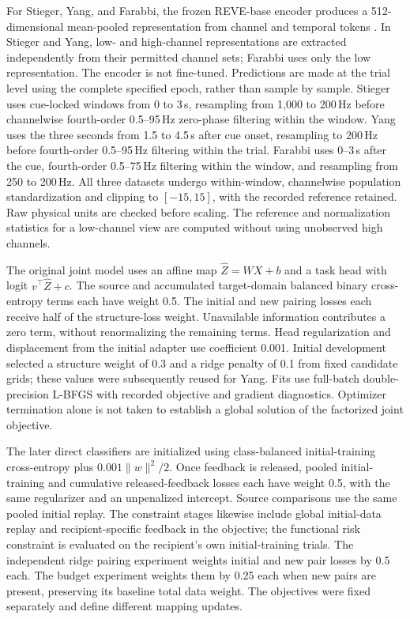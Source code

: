 \documentclass[11pt,a4paper]{article}
\begin{document}
For Stieger, Yang, and Farabbi, the frozen REVE-base encoder produces a 512-dimensional mean-pooled representation from channel and temporal tokens \cite{reve2025}. In Stieger and Yang, low- and high-channel representations are extracted independently from their permitted channel sets; Farabbi uses only the low representation. The encoder is not fine-tuned. Predictions are made at the trial level using the complete specified epoch, rather than sample by sample. Stieger uses cue-locked windows from 0 to 3\,s, resampling from 1,000 to 200\,Hz before channelwise fourth-order 0.5--95\,Hz zero-phase filtering within the window. Yang uses the three seconds from 1.5 to 4.5\,s after cue onset, resampling to 200\,Hz before fourth-order 0.5--95\,Hz filtering within the trial. Farabbi uses 0--3\,s after the cue, fourth-order 0.5--75\,Hz filtering within the window, and resampling from 250 to 200\,Hz. All three datasets undergo within-window, channelwise population standardization and clipping to $[-15,15]$, with the recorded reference retained. Raw physical units are checked before scaling. The reference and normalization statistics for a low-channel view are computed without using unobserved high channels.

The original joint model uses an affine map $\widehat Z=WX+b$ and a task head with logit $v^\top\widehat Z+c$. The source and accumulated target-domain balanced binary cross-entropy terms each have weight 0.5. The initial and new pairing losses each receive half of the structure-loss weight. Unavailable information contributes a zero term, without renormalizing the remaining terms. Head regularization and displacement from the initial adapter use coefficient 0.001. Initial development selected a structure weight of 0.3 and a ridge penalty of 0.1 from fixed candidate grids; these values were subsequently reused for Yang. Fits use full-batch double-precision L-BFGS with recorded objective and gradient diagnostics. Optimizer termination alone is not taken to establish a global solution of the factorized joint objective.

The later direct classifiers are initialized using class-balanced initial-training cross-entropy plus $0.001\|w\|^2/2$. Once feedback is released, pooled initial-training and cumulative released-feedback losses each have weight 0.5, with the same regularizer and an unpenalized intercept. Source comparisons use the same pooled initial replay. The constraint stages likewise include global initial-data replay and recipient-specific feedback in the objective; the functional risk constraint is evaluated on the recipient's own initial-training trials. The independent ridge pairing experiment weights initial and new pair losses by 0.5 each. The budget experiment weights them by 0.25 each when new pairs are present, preserving its baseline total data weight. The objectives were fixed separately and define different mapping updates.
\end{document}
